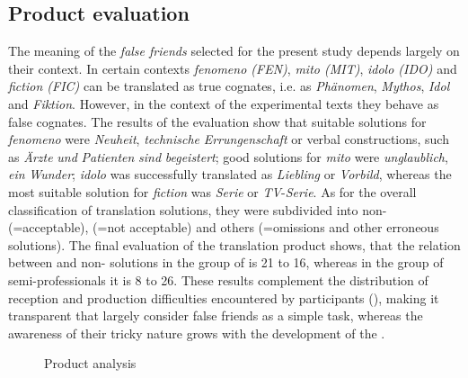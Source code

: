 \documentclass[output=paper]{langsci/langscibook.cls}
\begin{document}
\subsection{Product evaluation} 
The meaning of the \textit{false friends} selected for the present study depends largely on their context. In certain contexts \textit{fenomeno (FEN)}, \textit{mito (MIT)}, \textit{idolo (IDO)} and \textit{fiction (FIC)} can be translated as true cognates, i.e. as \textit{Phänomen}, \textit{Mythos}, \textit{Idol} and \textit{Fiktion}. However, in the context of the experimental texts they behave as false cognates.  The results of the evaluation show that suitable solutions for \textit{fenomeno} were \textit{Neuheit}, \textit{technische} \textit{Errungenschaft} or verbal constructions, such as \textit{Ärzte} \textit{und} \textit{Patienten} \textit{sind} \textit{begeistert}; good solutions for \textit{mito} were \textit{unglaublich}, \textit{ein} \textit{Wunder};  \textit{idolo} was successfully translated as \textit{Liebling} or \textit{Vorbild}, whereas the most suitable solution for \textit{fiction} was \textit{Serie} or \textit{TV}{}-\textit{Serie}.  As for the overall classification of translation solutions, they were subdivided into non- (=acceptable),  (=not acceptable) and others (=omissions and other erroneous solutions). The final evaluation of the translation product shows, that the relation between  and non- solutions in the group of  is 21 to 16, whereas in the group of semi-professionals it is 8 to 26. These results complement the distribution of reception and production difficulties encountered by participants (),  making it transparent that  largely consider false friends as a simple task, whereas the awareness of their tricky nature grows with the development of the . 

\begin{figure}
    \caption{Product analysis}
    \label{kloster:fig:1}
\end{figure}
\end{document}

